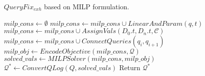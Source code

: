 

\begin{algorithm}[htbp]
\caption{$QueryFix_{exh}$ based on MILP formulation.}
\label{alg:basic}
\scriptsize
\begin{algorithmic}
\STATE $milp\_cons \leftarrow \emptyset$
\STATE $milp\_cons \leftarrow milp\_cons \cup LinearAndParam(q, t)$
\ENDFOR
\STATE $milp\_cons \leftarrow milp\_cons \cup AssignVals(D_0.t, D_n.t, \mathcal{C})$
\STATE $milp\_cons \leftarrow milp\_cons \cup ConnectQueries(q_i, q_{i+1})$
\ENDFOR
\ENDFOR 
\STATE $milp\_obj \leftarrow EncodeObjective(milp\_cons, \mathcal{Q})$
\STATE $solved\_vals \leftarrow MILPSolver(milp\_cons, milp\_obj)$
\STATE $\mathcal{Q}^* \leftarrow ConvertQLog(Q, solved\_vals)$
\STATE Return $\mathcal{Q}^*$
\end{algorithmic}
\end{algorithm}



















